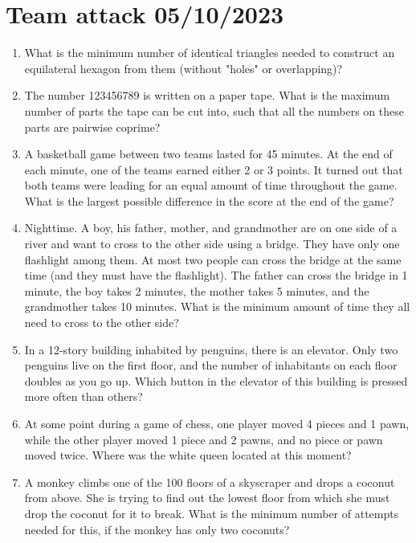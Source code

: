 \documentclass[11pt]{article}
\begin{document}
  \newpage
  \section*{Team attack 05/10/2023}
  \enlargethispage*{2\baselineskip}
  \begin{enumerate}[leftmargin=0mm]
    \item What is the minimum number of identical triangles needed to construct an equilateral hexagon from them (without "holes" or overlapping)? %
    \item The number 123456789 is written on a paper tape. What is the maximum number of parts the tape can be cut into, such that all the numbers on these parts are pairwise coprime? %
    \item A basketball game between two teams lasted for 45 minutes. At the end of each minute, one of the teams earned either 2 or 3 points. It turned out that both teams were leading for an equal amount of time throughout the game. What is the largest possible difference in the score at the end of the game? %
    \item 
    Nighttime. A boy, his father, mother, and grandmother are on one side of a river and want to cross to the other side using a bridge. They have only one flashlight among them. At most two people can cross the bridge at the same time (and they must have the flashlight). The father can cross the bridge in 1 minute, the boy takes 2 minutes, the mother takes 5 minutes, and the grandmother takes 10 minutes. What is the minimum amount of time they all need to cross to the other side? %
    \item In a 12-story building inhabited by penguins, there is an elevator. Only two penguins live on the first floor, and the number of inhabitants on each floor doubles as you go up. Which button in the elevator of this building is pressed more often than others? %
    \item At some point during a game of chess, one player moved 4 pieces and 1 pawn, while the other player moved 1 piece and 2 pawns, and no piece or pawn moved twice. Where was the white queen located at this moment? %
    \item A monkey climbs one of the 100 floors of a skyscraper and drops a coconut from above. She is trying to find out the lowest floor from which she must drop the coconut for it to break. What is the minimum number of attempts needed for this, if the monkey has only two coconuts? %
  \end{enumerate}
\end{document}
